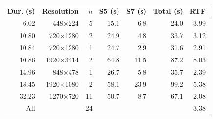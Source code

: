 \begin{tabular}{@{}rrrrrrr@{}}
\toprule
Dur. (s) & Resolution & $n$ & S5 (s) & S7 (s) & Total (s) & RTF \\
\midrule
6.02 & 448$\times$224 & 5 & 15.1 & 6.8 & 24.0 & 3.99 \\
10.80 & 720$\times$1280 & 2 & 24.9 & 4.8 & 33.7 & 3.12 \\
10.84 & 720$\times$1280 & 1 & 24.7 & 2.9 & 31.6 & 2.91 \\
10.86 & 1920$\times$3414 & 2 & 64.8 & 11.5 & 87.2 & 8.03 \\
14.96 & 848$\times$478 & 1 & 26.7 & 5.8 & 35.7 & 2.39 \\
18.45 & 1920$\times$1080 & 2 & 58.1 & 23.9 & 99.2 & 5.38 \\
32.23 & 1270$\times$720 & 11 & 50.7 & 8.7 & 67.1 & 2.08 \\
\midrule
All & & 24 & & & & 3.38 \\
\bottomrule
\end{tabular}
